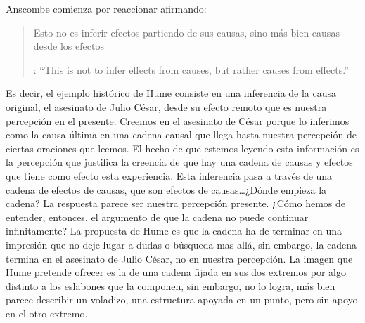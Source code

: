 Anscombe comienza por reaccionar afirmando: \blockquote[{\cite[86]{anscombe1981parmenides:humeandjulius}}: \enquote{This is not to infer effects from causes, but rather causes from effects.}]{Esto no es inferir efectos partiendo de sus causas, sino más bien causas desde los efectos}. Es decir, el ejemplo histórico de Hume consiste en una inferencia de la causa original, el asesinato de Julio César, desde su efecto remoto que es nuestra percepción en el presente. Creemos en el asesinato de César porque lo inferimos como la causa última en una cadena causal que llega hasta nuestra percepción de ciertas oraciones que leemos. El hecho de que estemos leyendo esta información es la percepción que justifica la creencia de que hay una cadena de causas y efectos que tiene como efecto esta experiencia. Esta inferencia pasa a través de una cadena de efectos de causas, que son efectos de causas\ldots ¿Dónde empieza la cadena? La respuesta parece ser nuestra percepción presente. ¿Cómo hemos de entender, entonces, el argumento de que la cadena no puede continuar infinitamente? La propuesta de Hume es que la cadena ha de terminar en una impresión que no deje lugar a dudas o búsqueda mas allá, sin embargo, la cadena termina en el asesinato de Julio César, no en nuestra percepción. La imagen que Hume pretende ofrecer es la de una cadena fijada en sus dos extremos por algo distinto a los eslabones que la componen, sin embargo, no lo logra, más bien parece describir un voladizo, una estructura apoyada en un punto, pero sin apoyo en el otro extremo.

